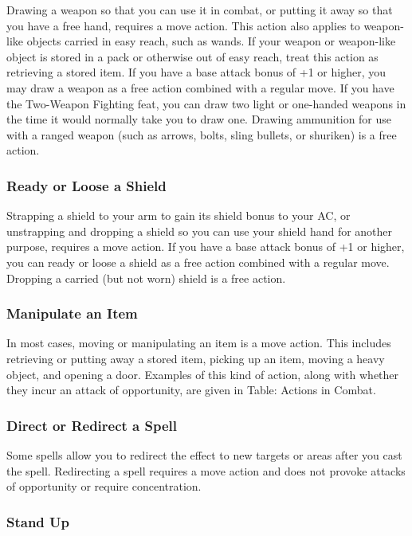 Drawing a weapon so that you can use it in combat, or putting it away so that you have a free hand, requires a move action. This action also applies to weapon-like objects carried in easy reach, such as wands. If your weapon or weapon-like object is stored in a pack or otherwise out of easy reach, treat this action as retrieving a stored item. If you have a base attack bonus of +1 or higher, you may draw a weapon as a free action combined with a regular move. If you have the Two-Weapon Fighting feat, you can draw two light or one-handed weapons in the time it would normally take you to draw one. Drawing ammunition for use with a ranged weapon (such as arrows, bolts, sling bullets, or shuriken) is a free action.

\subsubsection{Ready or Loose a Shield}

Strapping a shield to your arm to gain its shield bonus to your AC, or unstrapping and dropping a shield so you can use your shield hand for another purpose, requires a move action. If you have a base attack bonus of +1 or higher, you can ready or loose a shield as a free action combined with a regular move. Dropping a carried (but not worn) shield is a free action.

\subsubsection{Manipulate an Item}

In most cases, moving or manipulating an item is a move action. This includes retrieving or putting away a stored item, picking up an item, moving a heavy object, and opening a door. Examples of this kind of action, along with whether they incur an attack of opportunity, are given in Table: Actions in Combat.

\subsubsection{Direct or Redirect a Spell}

Some spells allow you to redirect the effect to new targets or areas after you cast the spell. Redirecting a spell requires a move action and does not provoke attacks of opportunity or require concentration.

\subsubsection{Stand Up}

